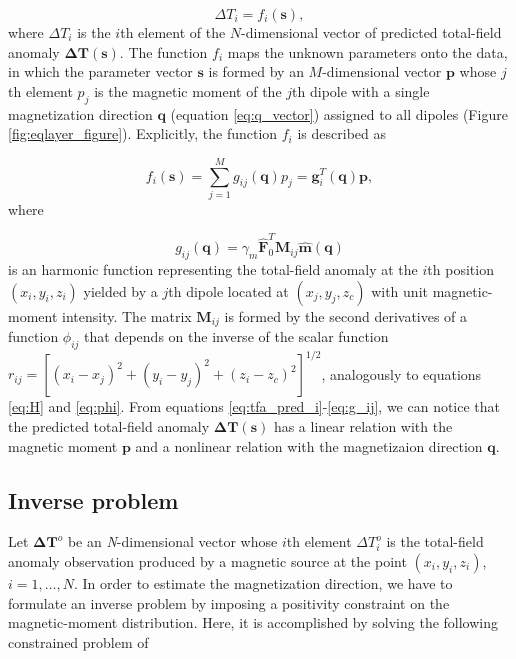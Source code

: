 \begin{equation}
\Delta T_i = f_i(\mathbf{s}) ,
\label{eq:tfa_pred_i}
\end{equation}    
where $\Delta T_i$ is the $i$th element of the $N$-dimensional vector of predicted total-field anomaly $\mathbf{\Delta T}(\mathbf{s})$. The function $f_i$ maps the unknown parameters onto the data, in which the parameter vector $\mathbf{s}$ is formed by an $M$-dimensional vector $\mathbf{p}$ whose $j$th element $p_j$ is the magnetic moment of the $j$th dipole with a single magnetization direction $\mathbf{q}$ (equation \ref{eq:q_vector}) assigned to all dipoles (Figure \ref{fig:eqlayer_figure}). Explicitly, the function $f_i$ is described as 

\begin{equation}
f_i (\mathbf{s}) = \sum_{j=1}^{M} g_{ij}(\mathbf{q}) p_j  = \mathbf{g}_{i}^T(\mathbf{q}) \mathbf{p},
\label{eq:f_i}
\end{equation}
where

\begin{equation}
g_{ij} (\mathbf{q})  = \gamma_m \hat{\mathbf{F}}_0^T \mathbf{M}_{ij} \hat{\mathbf{m}}(\mathbf{q})
\label{eq:g_ij}
\end{equation}
is an harmonic function representing the total-field anomaly at the $i$th position $(x_i,y_i,z_i)$ yielded by a $j$th dipole located at $(x_j,y_j,z_c)$ with unit magnetic-moment intensity. The matrix $\mathbf{M}_{ij}$ is formed by the second derivatives of a function $\phi_{ij}$ that depends on the inverse of the scalar function $r_{ij} = [(x_i-x_j)^2 + (y_i-y_j)^2 + (z_i-z_c)^2]^{1/2}$, analogously to equations \ref{eq:H} and \ref{eq:phi}. From equations \ref{eq:tfa_pred_i}-\ref{eq:g_ij}, we can notice that the predicted total-field anomaly $\mathbf{\Delta T} (\mathbf{s})$ has a linear relation with the magnetic moment $\mathbf{p}$ and a nonlinear relation with the magnetizaion direction $\mathbf{q}$.    

\subsection{Inverse problem}

Let $\mathbf{\Delta T}^o$ be an \textit{N}-dimensional vector whose $i$th element $\Delta T_i^o$ is the total-field anomaly observation produced by a magnetic source at the point $(x_i,y_i,z_i)$, $i = 1, \ldots, N$. In order to estimate the magnetization direction, we have to formulate an inverse problem by imposing a positivity constraint on the magnetic-moment distribution. Here, it is accomplished by solving the following constrained problem of

